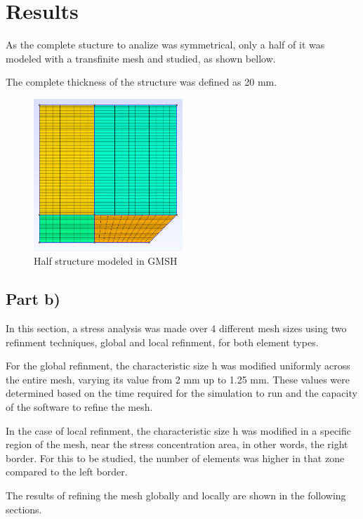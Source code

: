 \section{Results}

As the complete stucture to analize was symmetrical, only a half of it was modeled with a transfinite mesh and studied, as shown bellow.

The complete thickness of the structure was defined as 20 mm.

\begin{figure}[H]
    \centering
    \includegraphics[width=0.5\textwidth]{img/geometria.png}
    \caption{Half structure modeled in GMSH}
    \label{fig:half_structure}
\end{figure}

\subsection{Part b)}

In this section, a stress analysis was made over 4 different mesh sizes using two refinment techniques, global and local refinment, for both element types.

For the global refinment, the characteristic size h was modified uniformly across the entire mesh, varying its value from 2 mm up to 1.25 mm. These values were determined based on the time required for the simulation to run and the capacity of the software to refine the mesh.

In the case of local refinment, the characteristic size h was modified in a specific region of the mesh, near the stress concentration area, in other words, the right border. For this to be studied, the number of elements was higher in that zone compared to the left border.

The results of refining the mesh globally and locally are shown in the following sections.

